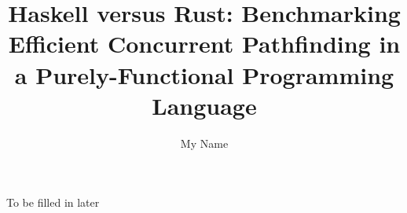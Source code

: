 \documentclass[oneside]{etd}
\title{Haskell versus Rust: Benchmarking Efficient Concurrent Pathfinding in a Purely-Functional Programming Language}
\author{My Name}
\begin{document}
\maketitle
\makerecomm
\makeacceptance
\makedeclaration


\begin{execsummary}
	To be filled in later
\end{execsummary}

	



\begingroup
\renewcommand*{\addvspace}[1]{}
\tableofcontents
\listoffigures
\listoftables
\endgroup

\beginbody
{}








\appendix
% 
% 
% 

% 

\nocite{*}

{
\singlespace

}


\end{document}
